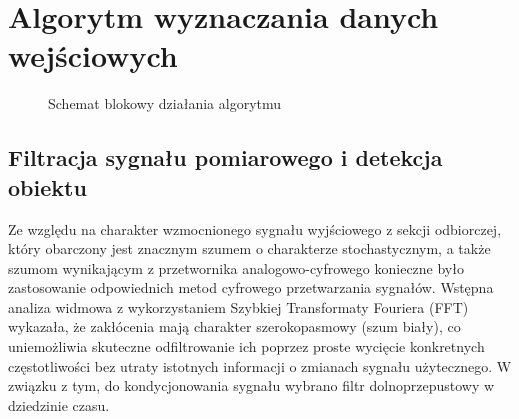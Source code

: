 
\section{Algorytm wyznaczania danych wejściowych}

\begin{figure}
    \centering
    \caption{Schemat blokowy działania algorytmu}\label{fig:diagram}
\end{figure}

\subsection{Filtracja sygnału pomiarowego i detekcja obiektu}

Ze względu na charakter wzmocnionego sygnału wyjściowego z sekcji odbiorczej, który obarczony jest znacznym szumem o charakterze stochastycznym, a także szumom wynikającym z przetwornika analogowo-cyfrowego konieczne było zastosowanie odpowiednich metod cyfrowego przetwarzania sygnałów. Wstępna analiza widmowa z wykorzystaniem Szybkiej Transformaty Fouriera (FFT) wykazała, że zakłócenia mają charakter szerokopasmowy (szum biały), co uniemożliwia skuteczne odfiltrowanie ich poprzez proste wycięcie konkretnych częstotliwości bez utraty istotnych informacji o zmianach sygnału użytecznego. W związku z tym, do kondycjonowania sygnału wybrano filtr dolnoprzepustowy w dziedzinie czasu.

